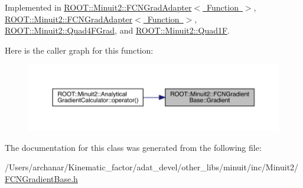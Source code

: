 Implemented in \mbox{\hyperlink{classROOT_1_1Minuit2_1_1FCNGradAdapter_ae91d0453fd5e953f75551576659d6c7b}{R\+O\+O\+T\+::\+Minuit2\+::\+F\+C\+N\+Grad\+Adapter$<$ Function $>$}}, \mbox{\hyperlink{classROOT_1_1Minuit2_1_1FCNGradAdapter_ae91d0453fd5e953f75551576659d6c7b}{R\+O\+O\+T\+::\+Minuit2\+::\+F\+C\+N\+Grad\+Adapter$<$ Function $>$}}, \mbox{\hyperlink{classROOT_1_1Minuit2_1_1Quad4FGrad_afd3b64a4236e31bdf9c330e33ac7ac89}{R\+O\+O\+T\+::\+Minuit2\+::\+Quad4\+F\+Grad}}, and \mbox{\hyperlink{classROOT_1_1Minuit2_1_1Quad1F_a5862cb7b7c00f86bcff155d0033abd7f}{R\+O\+O\+T\+::\+Minuit2\+::\+Quad1F}}.

Here is the caller graph for this function\+:\nopagebreak
\begin{figure}[H]
\begin{center}
\leavevmode
\includegraphics[width=350pt]{d2/d53/classROOT_1_1Minuit2_1_1FCNGradientBase_a004740e7e25a1358aafde6694196ef88_icgraph}
\end{center}
\end{figure}


The documentation for this class was generated from the following file\+:\begin{DoxyCompactItemize}
\item 
/\+Users/archanar/\+Kinematic\+\_\+factor/adat\+\_\+devel/other\+\_\+libs/minuit/inc/\+Minuit2/\mbox{\hyperlink{other__libs_2minuit_2inc_2Minuit2_2FCNGradientBase_8h}{F\+C\+N\+Gradient\+Base.\+h}}\end{DoxyCompactItemize}
